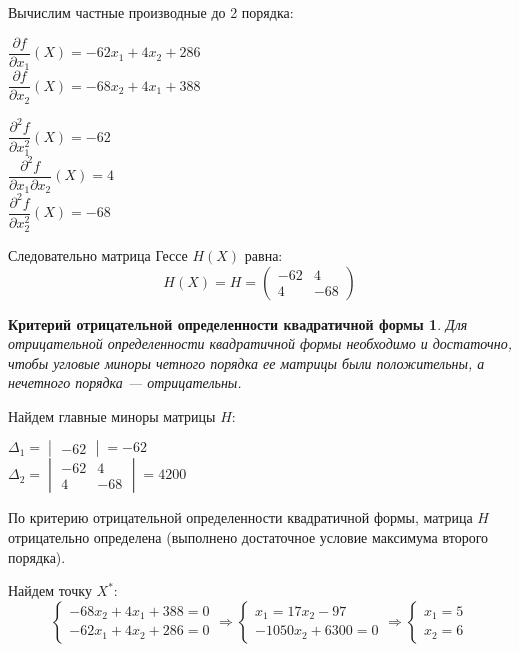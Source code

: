 Вычислим частные производные до 2 порядка:
\begin{multicols}{2}
	\centering
	$\dfrac{\partial f}{\partial x_1} \left(X\right) = -62 x_1 + 4 x_2 + 286$\\
	$\dfrac{\partial f}{\partial x_2} \left(X\right) = -68 x_2 + 4 x_1 + 388$
\end{multicols}

\begin{multicols}{3}
	\centering
	$\dfrac{\partial^2 f}{\partial x_1^2} \left(X\right) = -62$\\
	$\dfrac{\partial^2 f}{\partial x_1 \partial x_2} \left(X\right) = 4$\\
	$\dfrac{\partial^2 f}{\partial x_2^2} \left(X\right) = -68$
\end{multicols}
\vspace{0.3cm}

Следовательно матрица Гессе $H(X)$ равна:
\begin{equation*}
H(X) = H = 
\begin{pmatrix}
	-62 & 4 \\
	4 & -68
\end{pmatrix}
\end{equation*}

\newtheorem*{theorem3}{Критерий отрицательной определенности квадратичной формы}
\begin{theorem3}
Для отрицательной определенности квадратичной формы необходимо и достаточно, чтобы угловые миноры четного порядка ее матрицы были положительны, а нечетного порядка — отрицательны.
\end{theorem3}



Найдем главные миноры матрицы $H$:
\begin{multicols}{2}
\centering
$\Delta_1 = \begin{vmatrix} -62 \end{vmatrix} = -62$\\
$\Delta_2 = \begin{vmatrix}
	-62 & 4 \\
	4 & -68
\end{vmatrix} = 4200$
\end{multicols}
По критерию отрицательной определенности квадратичной формы, матрица $H$ отрицательно определена (выполнено достаточное условие максимума второго порядка).

Найдем точку $X^*$:
\begin{equation*}
\begin{cases}
	-68 x_2 + 4 x_1 + 388 = 0 \\
	-62 x_1 + 4 x_2 + 286 = 0 
\end{cases}\Rightarrow
\begin{cases}
	x_1 = 17 x_2 - 97 \\
	-1050 x_2 + 6300 = 0
\end{cases}\Rightarrow
\begin{cases}
	x_1 = 5 \\
	x_2 = 6
\end{cases}
\end{equation*}

